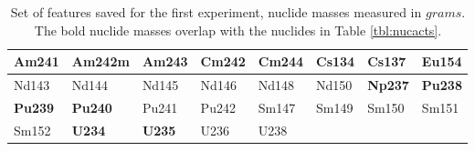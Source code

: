 \begin{table}[!htb]
  \centering
  \begin{tabular}{@{}|l|l|l|l|l|l|l|l|@{}}
    \toprule
    \textbf{Am241}&Am242m        &\textbf{Am243}&Cm242&\textbf{Cm244}&\textbf{Cs134}&\textbf{Cs137}&\textbf{Eu154} \\ \midrule
    Nd143         &Nd144         &Nd145         &Nd146&Nd148         &Nd150         &\textbf{Np237}&\textbf{Pu238} \\ \midrule
    \textbf{Pu239}&\textbf{Pu240}&Pu241         &Pu242&Sm147         &Sm149         &Sm150         &Sm151          \\ \midrule
    Sm152         &\textbf{U234} &\textbf{U235} &U236 &U238          &              &              &               \\ \bottomrule
  \end{tabular}
  \caption{Set of features saved for the first experiment, nuclide masses 
           measured in $grams$. The bold nuclide masses overlap with the 
           nuclides in Table \ref{tbl:nucacts}.}
  \label{tbl:nucmass}
\end{table}

